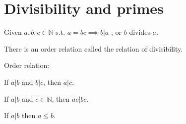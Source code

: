 \documentclass{article}
\begin{document}

\section{Divisibility and primes}


Given \( a,b,c \in \mathbb{N} \) s.t. \( a=bc \implies b | a \) ; or \( b \) divides \( a \). 

There is an order relation called the relation of divisibility. 

\begin{definition}[]
  Order relation: 
\end{definition}

\begin{theorem}[]
  If \( a | b \) and \( b | c \), then \( a | c \).
\end{theorem}

\begin{theorem}[]
  If \( a | b  \) and \( c \in \mathbb{N} \), then \( ac | bc \). 
\end{theorem}

\begin{theorem}[]
  If \( a | b \) then \( a \leq b \).
\end{theorem}
\end{document}
